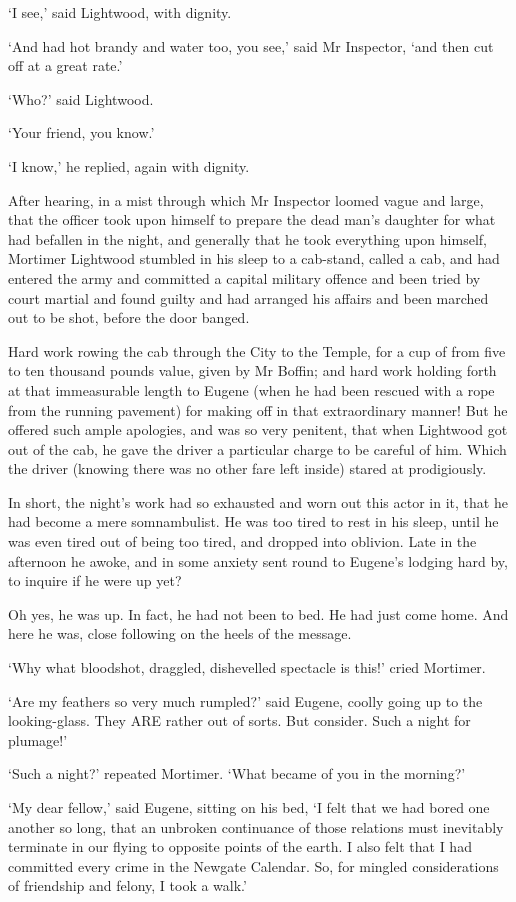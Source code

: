 ‘I see,’ said Lightwood, with dignity.

‘And had hot brandy and water too, you see,’ said Mr Inspector, ‘and
then cut off at a great rate.’

‘Who?’ said Lightwood.

‘Your friend, you know.’

‘I know,’ he replied, again with dignity.

After hearing, in a mist through which Mr Inspector loomed vague and
large, that the officer took upon himself to prepare the dead man’s
daughter for what had befallen in the night, and generally that he took
everything upon himself, Mortimer Lightwood stumbled in his sleep to
a cab-stand, called a cab, and had entered the army and committed a
capital military offence and been tried by court martial and found
guilty and had arranged his affairs and been marched out to be shot,
before the door banged.

Hard work rowing the cab through the City to the Temple, for a cup of
from five to ten thousand pounds value, given by Mr Boffin; and hard
work holding forth at that immeasurable length to Eugene (when he had
been rescued with a rope from the running pavement) for making off in
that extraordinary manner! But he offered such ample apologies, and was
so very penitent, that when Lightwood got out of the cab, he gave
the driver a particular charge to be careful of him. Which the driver
(knowing there was no other fare left inside) stared at prodigiously.

In short, the night’s work had so exhausted and worn out this actor in
it, that he had become a mere somnambulist. He was too tired to rest in
his sleep, until he was even tired out of being too tired, and dropped
into oblivion. Late in the afternoon he awoke, and in some anxiety sent
round to Eugene’s lodging hard by, to inquire if he were up yet?

Oh yes, he was up. In fact, he had not been to bed. He had just come
home. And here he was, close following on the heels of the message.

‘Why what bloodshot, draggled, dishevelled spectacle is this!’ cried
Mortimer.

‘Are my feathers so very much rumpled?’ said Eugene, coolly going up to
the looking-glass. They ARE rather out of sorts. But consider. Such a
night for plumage!’

‘Such a night?’ repeated Mortimer. ‘What became of you in the morning?’

‘My dear fellow,’ said Eugene, sitting on his bed, ‘I felt that we
had bored one another so long, that an unbroken continuance of those
relations must inevitably terminate in our flying to opposite points of
the earth. I also felt that I had committed every crime in the Newgate
Calendar. So, for mingled considerations of friendship and felony, I
took a walk.’



